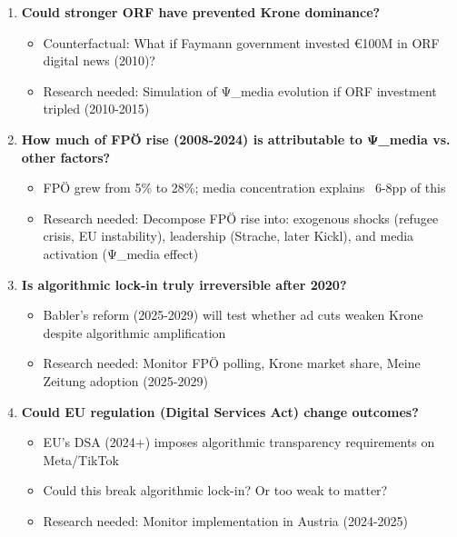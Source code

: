 {\begin{enumerate}
\item \textbf{Could stronger ORF have prevented Krone dominance?}
  \begin{itemize}
  \item Counterfactual: What if Faymann government invested €100M in ORF digital news (2010)?
  \item Research needed: Simulation of Ψ_media evolution if ORF investment tripled (2010-2015)
  \end{itemize}

\item \textbf{How much of FPÖ rise (2008-2024) is attributable to Ψ_media vs. other factors?}
  \begin{itemize}
  \item FPÖ grew from 5\% to 28\%; media concentration explains ~6-8pp of this
  \item Research needed: Decompose FPÖ rise into: exogenous shocks (refugee crisis, EU instability),
    leadership (Strache, later Kickl), and media activation (Ψ_media effect)
  \end{itemize}

\item \textbf{Is algorithmic lock-in truly irreversible after 2020?}
  \begin{itemize}
  \item Babler's reform (2025-2029) will test whether ad cuts weaken Krone despite algorithmic amplification
  \item Research needed: Monitor FPÖ polling, Krone market share, Meine Zeitung adoption (2025-2029)
  \end{itemize}

\item \textbf{Could EU regulation (Digital Services Act) change outcomes?}
  \begin{itemize}
  \item EU's DSA (2024+) imposes algorithmic transparency requirements on Meta/TikTok
  \item Could this break algorithmic lock-in? Or too weak to matter?
  \item Research needed: Monitor implementation in Austria (2024-2025)
  \end{itemize}
\end{enumerate}



}
